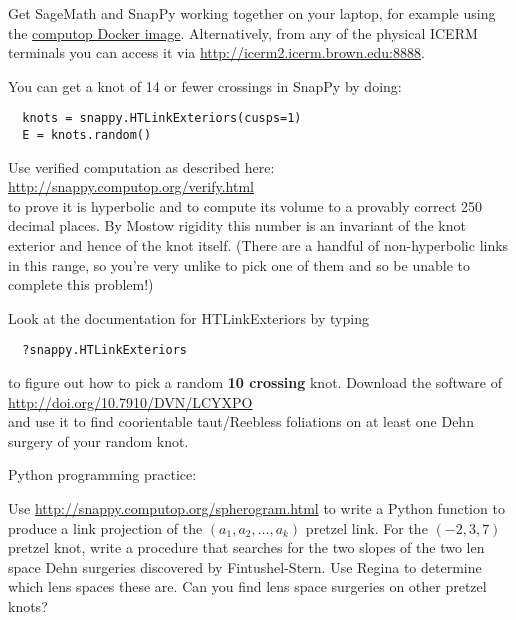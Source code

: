 \documentclass[tikz, a4paper]{nmd/hw}
\begin{document}
\begin{problems}
\item Get SageMath and SnapPy working together on your laptop, for
  example using the
  \href{http://bitbucket.org/t3m/sagedocker}{computop Docker
    image}.  Alternatively, from any of the physical ICERM terminals
  you can access it via \url{http://icerm2.icerm.brown.edu:8888}.

\item You can get a knot of 14 or fewer crossings in SnapPy by
  doing:

  \vspace{-0.5cm}
  
  \begin{verbatim}
  knots = snappy.HTLinkExteriors(cusps=1)
  E = knots.random()
  \end{verbatim}

  \vspace{-1cm}
  
  Use verified computation as described here:
  \url{http://snappy.computop.org/verify.html} \\
  to prove it is hyperbolic and to compute its volume to a provably
  correct 250 decimal places.  By Mostow rigidity this number is an
  invariant of the knot exterior and hence of the knot itself. (There
  are a handful of non-hyperbolic links in this range, so you're very
  unlike to pick one of them and so be unable to complete this problem!)

\item 
  Look at the documentation for HTLinkExteriors by typing
  \vspace{-0.5cm}
  
  \begin{verbatim}
  ?snappy.HTLinkExteriors
  \end{verbatim}

  \vspace{-1cm} to figure out how to pick a random \textbf{10
   crossing} knot.  Download the software of
  \\
  \url{http://doi.org/10.7910/DVN/LCYXPO}
  \\
  and use it to find coorientable taut/Reebless foliations on at least
  one Dehn surgery of your random knot.
  
\item Python programming practice: 

  Use \url{http://snappy.computop.org/spherogram.html} to write a
  Python function to produce a link projection of the
  $(a_1, a_2, \ldots, a_k)$ pretzel link.  For the $(-2, 3, 7)$
  pretzel knot, write a procedure that searches for the two slopes of
  the two len space Dehn surgeries discovered by Fintushel-Stern.  Use
  Regina to determine which lens spaces these are.  Can you find lens
  space surgeries on other pretzel knots?


\end{problems}
\end{document}
